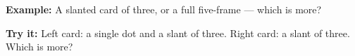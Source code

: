\documentclass[12pt]{article}
\begin{document}
\begin{examplebox}\textbf{Example:} \quad A slanted card of three, or a full
five-frame --- which is more?
\end{examplebox}

\begin{tryitbox}\textbf{Try it:} \quad Left card: a single dot and a slant of
three. Right card: a slant of three. Which is more?\ %
\end{tryitbox}
\end{document}

